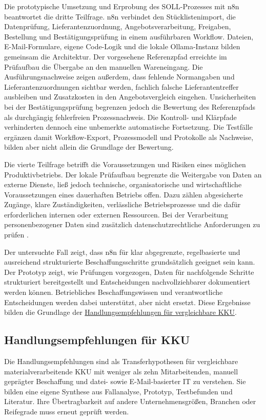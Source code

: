 \documentclass[a4paper,12pt]{article}
\begin{document}
Die prototypische Umsetzung und Erprobung des SOLL-Prozesses mit n8n beantwortet die dritte Teilfrage. n8n verbindet den Stücklistenimport, die Datenprüfung, Lieferantenzuordnung, Angebotsverarbeitung, Freigaben, Bestellung und Bestätigungsprüfung in einem ausführbaren Workflow. Dateien, E-Mail-Formulare, eigene Code-Logik und die lokale Ollama-Instanz bilden gemeinsam die Architektur. Der vorgesehene Referenzpfad erreichte im Prüfaufbau die Übergabe an den manuellen Wareneingang. Die Ausführungsnachweise zeigen außerdem, dass fehlende Normangaben und Lieferantenzuordnungen sichtbar werden, fachlich falsche Lieferantentreffer ausbleiben und Zusatzkosten in den Angebotsvergleich eingehen. Unsicherheiten bei der Bestätigungsprüfung begrenzen jedoch die Bewertung des Referenzpfads als durchgängig fehlerfreien Prozessnachweis. Die Kontroll- und Klärpfade verhinderten dennoch eine unbemerkte automatische Fortsetzung. Die Testfälle ergänzen damit Workflow-Export, Prozessmodell und Protokolle als Nachweise, bilden aber nicht allein die Grundlage der Bewertung.

Die vierte Teilfrage betrifft die Voraussetzungen und Risiken eines möglichen Produktivbetriebs. Der lokale Prüfaufbau begrenzte die Weitergabe von Daten an externe Dienste, ließ jedoch technische, organisatorische und wirtschaftliche Voraussetzungen eines dauerhaften Betriebs offen. Dazu zählen abgesicherte Zugänge, klare Zuständigkeiten, verlässliche Betriebsprozesse und die dafür erforderlichen internen oder externen Ressourcen. Bei der Verarbeitung personenbezogener Daten sind zusätzlich datenschutzrechtliche Anforderungen zu prüfen \parencite{eu_dsgvo_2016}.

Der untersuchte Fall zeigt, dass n8n für klar abgegrenzte, regelbasierte und ausreichend strukturierte Beschaffungsschritte grundsätzlich geeignet sein kann. Der Prototyp zeigt, wie Prüfungen vorgezogen, Daten für nachfolgende Schritte strukturiert bereitgestellt und Entscheidungen nachvollziehbarer dokumentiert werden können. Betriebliches Beschaffungswissen und verantwortliche Entscheidungen werden dabei unterstützt, aber nicht ersetzt. Diese Ergebnisse bilden die Grundlage der \hyperref[sec:handlungsempfehlungen-kku]{Handlungsempfehlungen für vergleichbare KKU}.

\subsection{Handlungsempfehlungen für KKU}
\label{sec:handlungsempfehlungen-kku}
Die Handlungsempfehlungen sind als Transferhypothesen für vergleichbare materialverarbeitende KKU mit weniger als zehn Mitarbeitenden, manuell geprägter Beschaffung und datei- sowie E-Mail-basierter IT zu verstehen. Sie bilden eine eigene Synthese aus Fallanalyse, Prototyp, Testbefunden und Literatur. Ihre Übertragbarkeit auf andere Unternehmensgrößen, Branchen oder Reifegrade muss erneut geprüft werden.
\end{document}
